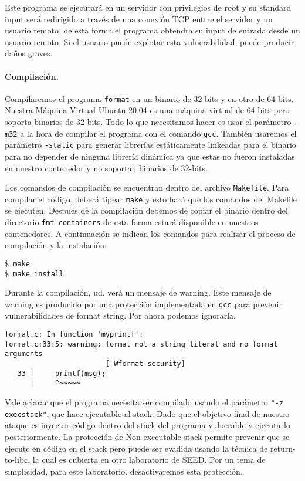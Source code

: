 Este programa se ejecutará en un servidor con privilegios de root y su standard input será redirigido a través de una conexión TCP enttre el servidor y un usuario remoto, de esta forma el programa obtendra su input de entrada desde un usuario remoto. Si el usuario puede explotar esta vulnerabilidad, puede producir daños graves.


\paragraph{Compilación.} 
Compilaremos el programa \texttt{format} en un binario de 32-bits y en otro de 64-bits. Nuestra Máquina Virtual Ubuntu 20.04 es una máquina virtual de 64-bits pero soporta binarios de 32-bits. Todo lo que necesitamos hacer es usar el parámetro \texttt{-m32} a la hora de compilar el programa con el comando  \texttt{gcc}.
También usaremos el parámetro \texttt{-static} para generar librerías estáticamente linkeadas para el binario para no depender de ninguna librería dinámica ya que estas no fueron instaladas en nuestro contenedor y no soportan binarios de 32-bits.

Los comandos de compilación se encuentran dentro del archivo \texttt{Makefile}. Para compilar el código, deberá tipear \texttt{make} y esto hará que los comandos del Makefile se ejecuten.
Después de la compilación debemos de copiar el binario dentro del directorio \texttt{fmt-containers} de esta forma estará disponible en nuestros contenedores.
A continuación se indican los comandos para realizar el proceso de compilación y la instalación:

\begin{lstlisting}
$ make
$ make install
\end{lstlisting}

Durante la compilación, ud. verá un mensaje de warning. Este mensaje de warning es producido por una protección implementada en \texttt{gcc} para prevenir vulnerabilidades de format string. Por ahora podemos ignorarla.

\begin{lstlisting}
format.c: In function 'myprintf':
format.c:33:5: warning: format not a string literal and no format arguments
                        [-Wformat-security]
   33 |     printf(msg);
      |     ^~~~~~
\end{lstlisting}

Vale aclarar que el programa necesita ser compilado usando el parámetro  \texttt{"-z execstack"}, que hace ejecutable al stack. Dado que el objetivo final de nuestro ataque es inyectar código dentro del stack del programa vulnerable y ejecutarlo posteriormente.
La protección de Non-executable stack permite prevenir que se ejecute en código en el stack pero puede ser evadida usando la técnica de return-to-libc, la cual es cubierta en otro laboratorio de SEED. Por un tema de simplicidad, para este laboratorio. desactivaremos esta protección.


